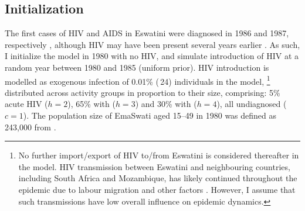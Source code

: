 \subsection{Initialization}\label{model.par.init}
The first cases of HIV and AIDS in Eswatini
were diagnosed in 1986 and 1987, respectively \cite{Whiteside2007},
although HIV may have been present several years earlier \cite{Iliffe2005}.
As such, I initialize the model in 1980 with no HIV,
and simulate introduction of HIV at a random year between 1980 and 1985 (uniform prior).
HIV introduction is modelled as
exogenous infection of 0.01\% (\ttilde\,24) individuals in the model,%
\footnote{No further import/export of HIV to/from Eswatini is considered thereafter in the model.
  HIV transmission between Eswatini and neighbouring countries,
  including South Africa and Mozambique,
  has likely continued throughout the epidemic
  due to labour migration and other factors \cite{Iliffe2005}.
  However, I assume that such transmissions have low overall influence on epidemic dynamics.}
distributed across activity groups in proportion to their size, comprising:
5\% acute HIV ($h=2$), 65\% with  ($h=3$) and 30\% with  ($h=4$),
all undiagnosed ($c=1$).
The population size of EmaSwati aged 15--49 in 1980
was defined as 243,000 from \cite{WorldBank}.
